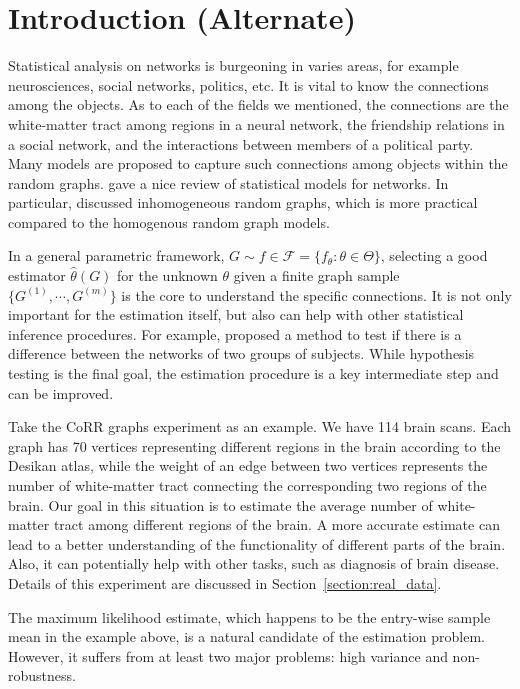 \documentclass[a4paper]{article}
\renewcommand{\hat}{\widehat}
\begin{document}
\section{Introduction (Alternate)}

Statistical analysis on networks is burgeoning in varies areas, for example neurosciences, social networks, politics, etc. It is vital to know the connections among the objects. As to each of the fields we mentioned, the connections are the white-matter tract among regions in a neural network, the friendship relations in a social network, and the interactions between members of a political party. Many models are proposed to capture such connections among objects within the random graphs. \cite{goldenberg2010survey} gave a nice review of statistical models for networks. In particular, \citet{bollobas2007phase} discussed inhomogeneous random graphs, which is more practical compared to the homogenous random graph models.

In a general parametric framework, $G \sim f \in \mathcal{F} = \{f_{\theta} : \theta \in \Theta \}$, selecting a good estimator $\hat{\theta}(G)$ for the unknown $\theta$ given a finite graph sample $\{G^{(1)}, \cdots, G^{(m)}\}$ is the core to understand the specific connections. It is not only important for the estimation itself, but also can help with other statistical inference procedures. For example, \citet{ginestet2014hypothesis} proposed a method to test if there is a difference between the networks of two groups of subjects. While hypothesis testing is the final goal, the estimation procedure is a key intermediate step and can be improved.

Take the CoRR graphs experiment as an example. We have 114 brain scans. Each graph has 70 vertices representing different regions in the brain according to the Desikan atlas, while the weight of an edge between two vertices represents the number of white-matter tract connecting the corresponding two regions of the brain. Our goal in this situation is to estimate the average number of white-matter tract among different regions of the brain. A more accurate estimate can lead to a better understanding of the functionality of different parts of the brain. Also, it can potentially help with other tasks, such as diagnosis of brain disease. Details of this experiment are discussed in Section~\ref{section:real_data}.

The maximum likelihood estimate, which happens to be the entry-wise sample mean in the example above, is a natural candidate of the estimation problem. However, it suffers from at least two major problems: high variance and non-robustness. 
\end{document}
